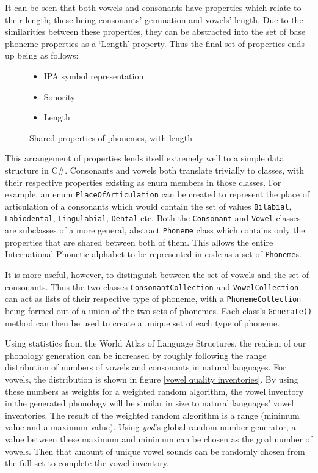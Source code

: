 \documentclass{report}
\newcommand{\Csh}{C{\lserif\#}}
\begin{document}
	It can be seen that both vowels and consonants have properties which relate to their length; these being consonants' gemination and vowels' length. Due to the similarities between these properties, they can be abstracted into the set of base phoneme properties as a `Length' property. Thus the final set of properties ends up being as follows:

	\begin{figure}[h]
	\caption{Shared properties of phonemes, with length}
	\label{shared properties of phonemes with length}
	\begin{tcolorbox}
		\begin{itemize}
			\item IPA symbol representation
			\item Sonority
			\item Length
		\end{itemize}
	\end{tcolorbox}
	\end{figure}

	This arrangement of properties lends itself extremely well to a simple data structure in \Csh{}. Consonants and vowels both translate trivially to classes, with their respective properties existing as enum members in those classes. For example, an enum \texttt{PlaceOfArticulation} can be created to represent the place of articulation of a consonants which would contain the set of values \texttt{Bilabial}, \texttt{Labiodental}, \texttt{Lingulabial}, \texttt{Dental} etc. Both the \texttt{Consonant} and \texttt{Vowel} classes are subclasses of a more general, abstract \texttt{Phoneme} class which contains only the properties that are shared between both of them. This allows the entire International Phonetic alphabet to be represented in code as a set of \texttt{Phoneme}s.
	
	It is more useful, however, to distinguish between the set of vowels and the set of consonants. Thus the two classes \texttt{ConsonantCollection} and \texttt{VowelCollection} can act as lists of their respective type of phoneme, with a \texttt{PhonemeCollection} being formed out of a union of the two sets of phonemes. Each class's \texttt{Generate()} method can then be used to create a unique set of each type of phoneme.
	
	Using statistics from the World Atlas of Language Structures, the realism of our phonology generation can be increased by roughly following the range distribution of numbers of vowels and consonants in natural languages. For vowels, the distribution is shown in figure \ref{vowel quality inventories}. By using these numbers as weights for a weighted random algorithm, the vowel inventory in the generated phonology will be similar in size to natural languages' vowel inventories. The result of the weighted random algorithm is a range (minimum value and a maximum value). Using \textit{yod}'s global random number generator, a value between these maximum and minimum can be chosen as the goal number of vowels. Then that amount of unique vowel sounds can be randomly chosen from the full set to complete the vowel inventory.
	
\end{document}
